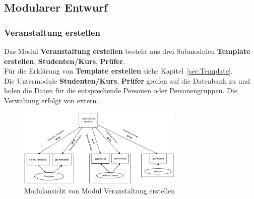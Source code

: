 \begin{appendix}
\clearpage
	
	\subsection{Modularer Entwurf}
	

	\subsubsection{Veranstaltung erstellen}
		Das Modul \textbf{Veranstaltung erstellen} besteht aus drei Submodulen \textbf{Template erstellen}, \textbf{Studenten/Kurs}, \textbf{Prüfer}.\\		
		Für die Erklärung von \textbf{Template erstellen} siehe Kapitel~\ref{sec:Template}.\\	
		Die Untermodule \textbf{Studenten/Kurs}, \textbf{Prüfer} greifen auf die Datenbank zu und holen die Daten für die entsprechende Personen oder Personengruppen. Die Verwaltung erfolgt von extern.
		
		
		
		\begin{figure}[H]
			\centering
			\includegraphics[width=0.7\textwidth]{./img/MD_VeranstaltungPlanen_main}
			\caption{Modulansicht von Modul Veranstaltung erstellen}
			\label{fig:md_veranstaltung_planen}
		\end{figure}
	

\end{appendix}
